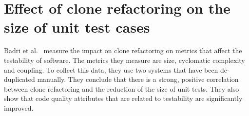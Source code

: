 \section{Effect of clone refactoring on the size of unit test cases}
Badri et al.~\cite{badri2019measuring} measure the impact on clone refactoring on metrics that affect the testability of software. The metrics they measure are size, cyclomatic complexity and coupling. To collect this data, they use two systems that have been de-duplicated manually. They conclude that there is a strong, positive correlation between clone refactoring and the reduction of the size of unit tests. They also show that code quality attributes that are related to testability are significantly improved.
